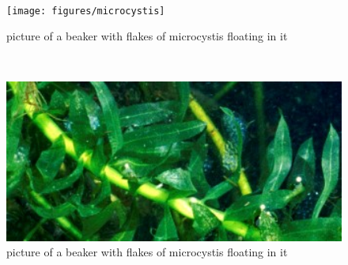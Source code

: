 \documentclass[
]{book}
\begin{document}
\begin{panel-grid}
\begin{columns-nocenter}
\begin{column800}
\end{column800}

\begin{column40}

~

\end{column40}

\begin{column800}

\begin{figure}

{\centering \texttt{[image: figures/microcystis]} 

}

\caption{picture of a beaker with flakes of microcystis floating in it}\label{fig:unnamed-chunk-86}
\end{figure}

\end{column800}

\begin{column40}

~

\end{column40}

\begin{column800}

\begin{figure}

{\centering \includegraphics[width=4.74in]{figures/egeria} 

}

\caption{picture of a beaker with flakes of microcystis floating in it}\label{fig:unnamed-chunk-87}
\end{figure}

\end{column800}

\end{columns-nocenter}

\begin{columns-nocenter}


\end{columns-nocenter}
\end{panel-grid}
\end{document}
